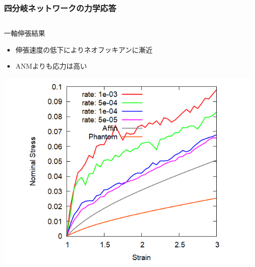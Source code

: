 \documentclass[12pt, dvipdfmx]{beamer}
\begin{document}
						
					

\begin{frame}
	\frametitle{四分岐ネットワークの力学応答}
		\begin{columns}[T, onlytextwidth]
				\begin{block}{一軸伸張結果}
					\begin{itemize}
						\item 伸張速度の低下によりネオフッキアンに漸近
						\item ANMよりも応力は高い
					\end{itemize}
					\includegraphics[width=\textwidth]{N48_C4_M3.png}
				\end{block}
				

\end{columns}
\end{frame}
\end{document}
